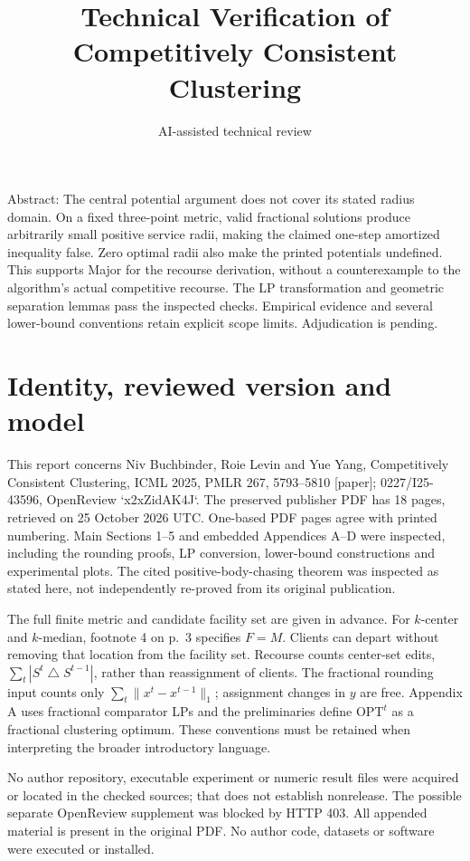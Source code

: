 \documentclass[10pt]{article}
\title{Technical Verification of Competitively Consistent Clustering}
\author{AI-assisted technical review}
\date{}
\begin{document}
\maketitle
Abstract: The central potential argument does not cover its stated radius domain. On a fixed three-point metric, valid fractional solutions produce arbitrarily small positive service radii, making the claimed one-step amortized inequality false. Zero optimal radii also make the printed potentials undefined. This supports Major for the recourse derivation, without a counterexample to the algorithm’s actual competitive recourse. The LP transformation and geometric separation lemmas pass the inspected checks. Empirical evidence and several lower-bound conventions retain explicit scope limits. Adjudication is pending.\par
\section*{Identity, reviewed version and model}
This report concerns Niv Buchbinder, Roie Levin and Yue Yang, Competitively Consistent Clustering, ICML 2025, PMLR 267, 5793–5810 [paper]; 0227/I25-43596, OpenReview `x2xZidAK4J`. The preserved publisher PDF has 18 pages, retrieved on 25 October 2026 UTC. One-based PDF pages agree with printed numbering. Main Sections 1–5 and embedded Appendices A–D were inspected, including the rounding proofs, LP conversion, lower-bound constructions and experimental plots. The cited positive-body-chasing theorem was inspected as stated here, not independently re-proved from its original publication.\par
The full finite metric and candidate facility set are given in advance. For \(k\)-center and \(k\)-median, footnote 4 on p. 3 specifies \(F=M\). Clients can depart without removing that location from the facility set. Recourse counts center-set edits, \(\sum_t|S^t\mathbin{\triangle}S^{t-1}|\), rather than reassignment of clients. The fractional rounding input counts only \(\sum_t\|x^t-x^{t-1}\|_1\); assignment changes in \(y\) are free. Appendix A uses fractional comparator LPs and the preliminaries define \(\mathrm{OPT}^t\) as a fractional clustering optimum. These conventions must be retained when interpreting the broader introductory language.\par
No author repository, executable experiment or numeric result files were acquired or located in the checked sources; that does not establish nonrelease. The possible separate OpenReview supplement was blocked by HTTP 403. All appended material is present in the original PDF. No author code, datasets or software were executed or installed.\par
\end{document}
